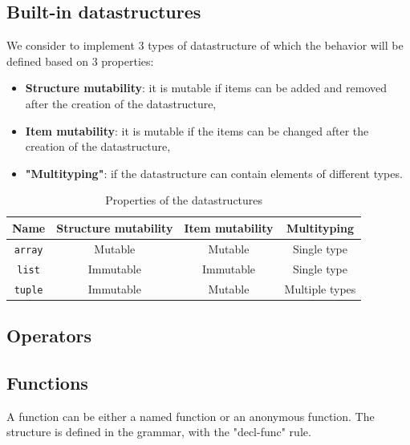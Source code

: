 \documentclass[a4paper,titlepage]{article}
\begin{document}
  \subsection{Built-in datastructures}

We consider to implement 3 types of datastructure of which the behavior will be defined based on 3 properties:
\begin{itemize}
  \item \textbf{Structure mutability}: it is mutable if items can be added and removed after the creation of the datastructure,
  \item \textbf{Item mutability}: it is mutable if the items can be changed after the creation of the datastructure,
  \item \textbf{"Multityping"}: if the datastructure can contain elements of different types. 
\end{itemize}

\begin{table}[h!]
  \center
  \begin{tabular}{c|ccc}
    Name & Structure mutability & Item mutability & Multityping\\
    \hline
    \texttt{array} & Mutable & Mutable & Single type\\
    \texttt{list} & Immutable & Immutable & Single type\\
    \texttt{tuple} & Immutable & Mutable & Multiple types
  \end{tabular}
  \caption{Properties of the datastructures}
\end{table}

  \subsection{Operators}


  \subsection{Functions}

A function can be either a named function or an anonymous function. The structure is defined in the grammar, with the "decl-func" rule.


\newpage
\end{document}
